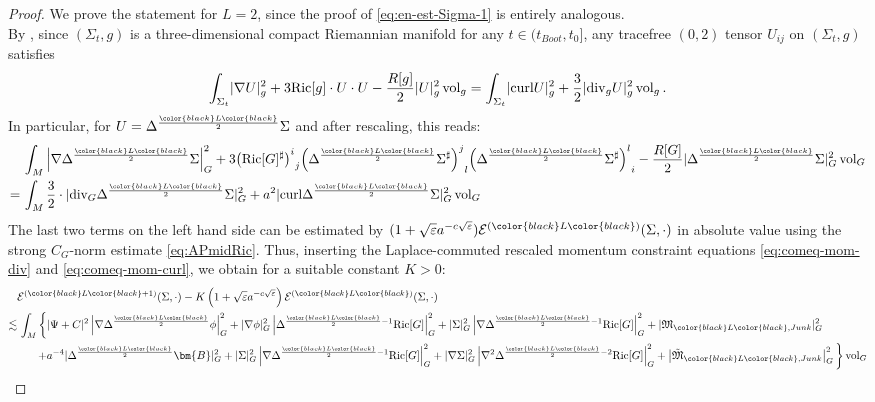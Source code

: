 \documentclass[11pt,leqno,textwidth=10cm]{amsart}
\numberwithin{equation}{section}
\theoremstyle{definition}
\theoremstyle{plain}
\newcommand{\1}{\mathbbm{1}}
\newcommand{\E}{\mathcal{E}}
\newcommand{\Ric}{\text{\normalfont{Ric}}}
\newcommand{\vol}[1]{{\text{\normalfont{vol}}}_{#1}}
\renewcommand{\epsilon}{\varepsilon}
\newcommand{\Lap}{\Delta}
\renewcommand{\div}{\text{\normalfont{div}}}
\newcommand{\curl}{\text{\normalfont{curl}}}
\newcommand{\RB}{\bm{B}}
\newcommand{\change}[1]{\color{black}#1\color{black}}
\begin{document}
\begin{proof}\change{We prove the statement for $L=2$, since the proof of \eqref{eq:en-est-Sigma-1} is entirely analogous.}\\
By \cite[(A.22)]{AM03}, since $(\Sigma_t,g)$ is a three-dimensional compact Riemannian manifold for any $t\in(t_{Boot},t_0]$, any tracefree $(0,2)$ tensor $U_{ij}$ on $(\Sigma_t,g)$ satisfies
\begin{equation}\label{eq:curl-div-elliptic}
\int_{\Sigma_t} \lvert\nabla U\rvert_g^2+3\Ric[g]\cdot U\cdot U-\frac{R[g]}2\lvert U\rvert_g^2\,\vol{g}=\int_{\Sigma_t} \lvert\curl U\rvert_g^2+\frac32\lvert\div_g U\rvert_g^2\,\vol{g}\,.
\end{equation}
In particular, for $U=\Lap^{\frac{\change{L}}2}\Sigma$ and after rescaling, this reads:
\begin{align*}
&\,\int_M \left\lvert\nabla\Lap^{\frac{\change{L}}2}\Sigma\right\rvert_G^2+3{\left(\Ric[G]^\sharp\right)^i}_j{\left(\Lap^{\frac{\change{L}}2}\Sigma^\sharp\right)^j}_l{\left(\Lap^{\frac{\change{L}}2}\Sigma^\sharp\right)^l}_i-\frac{R[G]}2\lvert\Lap^\frac{\change{L}}2\Sigma\rvert_G^2\,\vol{G}\\
=&\,\int_M\frac32\cdot\lvert\div_G\Lap^\frac{\change{L}}2\Sigma\rvert_G^2+a^2\lvert\curl\Lap^\frac{\change{L}}2\Sigma\rvert_G^2\,\vol{G}
\end{align*}
The last two terms on the left hand side can be estimated by $(1+\sqrt{\epsilon}a^{-c\sqrt{\epsilon}})\E^{(\change{L})}(\Sigma,\cdot)$ in absolute value using the strong $C_G$-norm estimate \eqref{eq:APmidRic}. Thus, inserting the Laplace-commuted rescaled momentum constraint equations \eqref{eq:comeq-mom-div} and \eqref{eq:comeq-mom-curl}, we obtain for a suitable constant $K>0$:
\begin{align*}
&\E^{(\change{L}+1)}(\Sigma,\cdot)-K\left(1+\sqrt{\epsilon}a^{-c\sqrt{\epsilon}}\right)\E^{(\change{L})}(\Sigma,\cdot)\\
\lesssim&\,\int_M\left\{\lvert\Psi+C\rvert^2\left\lvert\nabla\Lap^{\frac{\change{L}}2}\phi\right\rvert_G^2+\lvert\nabla\phi\rvert_G^2\left\lvert\Lap^{\frac{\change{L}}2-1}\Ric[G]\right\rvert_G^2+\lvert\Sigma\rvert_G^2\left\lvert\nabla\Lap^{\frac{\change{L}}2-1}\Ric[G]\right\rvert_G^2+\lvert\mathfrak{M}_{\change{L},Junk}\rvert_G^2\right.\\
&\,\phantom{\int_M}\left.+a^{-4}\lvert\Lap^\frac{\change{L}}2\RB\rvert_G^2+\lvert\Sigma\rvert_G^2\left\lvert\nabla\Lap^{\frac{\change{L}}2-1}\Ric[G]\right\rvert_G^2+\lvert\nabla\Sigma\rvert_G^2\left\lvert\nabla^2\Lap^{\frac{\change{L}}2-2}\Ric[G]\right\rvert_G^2+\left\lvert\tilde{\mathfrak{M}}_{\change{L},Junk}\right\rvert_G^2\,\right\}\vol{G}

\end{align*}
\end{proof}
\end{document}
